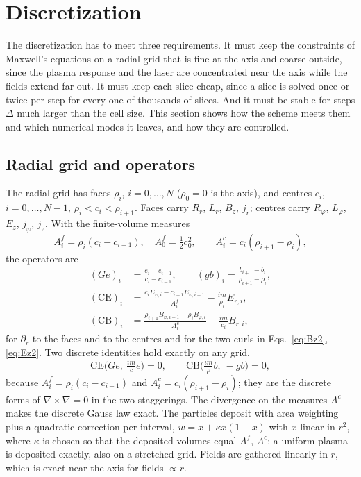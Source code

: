 \documentclass[preprint,12pt]{elsarticle}
\begin{document}
\section{Discretization}\label{sec:disc}

The discretization has to meet three requirements. It must keep the constraints of Maxwell's equations on a radial grid that is fine at the axis and coarse outside, since the plasma response and the laser are concentrated near the axis while the fields extend far out. It must keep each slice cheap, since a slice is solved once or twice per step for every one of thousands of slices. And it must be stable for steps $\Delta$ much larger than the cell size. This section shows how the scheme meets them and which numerical modes it leaves, and how they are controlled.

\subsection{Radial grid and operators}

The radial grid has faces $\rho_i$, $i = 0,\dots,N$ ($\rho_0 = 0$ is the axis), and centres $c_i$, $i = 0,\dots,N-1$, $\rho_i < c_i < \rho_{i+1}$. Faces carry $R_r$, $L_r$, $B_z$, $j_r$; centres carry $R_\varphi$, $L_\varphi$, $E_z$, $j_\varphi$, $j_z$. With the finite-volume measures
\begin{equation}
A^f_i = \rho_i (c_i - c_{i-1}), \quad A^f_0 = \tfrac12 c_0^2, \qquad A^c_i = c_i(\rho_{i+1} - \rho_i),
\end{equation}
the operators are
\begin{align}
(G e)_i &= \frac{e_i - e_{i-1}}{c_i - c_{i-1}}, \qquad
(g b)_i = \frac{b_{i+1} - b_i}{\rho_{i+1} - \rho_i}, \\
(\mathrm{CE})_i &= \frac{c_i E_{\varphi,i} - c_{i-1}E_{\varphi,i-1}}{A^f_i} - \frac{im}{\rho_i}E_{r,i}, \\
(\mathrm{CB})_i &= \frac{\rho_{i+1}B_{\varphi,i+1} - \rho_i B_{\varphi,i}}{A^c_i} - \frac{im}{c_i}B_{r,i},
\end{align}
for $\partial_r$ to the faces and to the centres and for the two curls in Eqs.~\eqref{eq:Bz2}, \eqref{eq:Ez2}. Two discrete identities hold exactly on any grid,
\begin{equation}
\mathrm{CE}\bigl(G e,\ \tfrac{im}{c} e\bigr) = 0, \qquad \mathrm{CB}\bigl(\tfrac{im}{\rho} b,\ -g b\bigr) = 0, \label{eq:curlgrad}
\end{equation}
because $A^f_i = \rho_i(c_i - c_{i-1})$ and $A^c_i = c_i(\rho_{i+1}-\rho_i)$; they are the discrete forms of $\nabla\times\nabla = 0$ in the two staggerings. The divergence on the measures $A^c$ makes the discrete Gauss law exact. The particles deposit with area weighting plus a quadratic correction per interval, $w = x + \kappa x(1-x)$ with $x$ linear in $r^2$, where $\kappa$ is chosen so that the deposited volumes equal $A^f$, $A^c$: a uniform plasma is deposited exactly, also on a stretched grid. Fields are gathered linearly in $r$, which is exact near the axis for fields $\propto r$.
\end{document}
